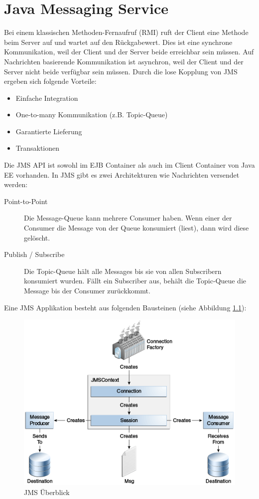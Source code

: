 \chapter{Java Messaging Service}

Bei einem klassischen Methoden-Fernaufruf (RMI) ruft der Client eine Methode beim Server auf und wartet auf den Rückgabewert. Dies ist eine synchrone Kommunikation, weil der Client und der Server beide erreichbar sein müssen. Auf Nachrichten basierende Kommunikation ist asynchron, weil der Client und der Server nicht beide verfügbar sein müssen. Durch die lose Kopplung von JMS ergeben sich folgende Vorteile:

\begin{itemize}
	\item Einfache Integration
	\item One-to-many Kommunikation (z.B. Topic-Queue)
	\item Garantierte Lieferung
	\item Transaktionen
\end{itemize}

Die JMS API ist sowohl im EJB Container als auch im Client Container von Java EE vorhanden. In JMS gibt es zwei Architekturen wie Nachrichten versendet werden:

\begin{description}
	\item[Point-to-Point] Die Message-Queue kann mehrere Consumer haben. Wenn einer der Consumer die Message von der Queue konsumiert (liest), dann wird diese gelöscht.
	\item[Publish / Subscribe] Die Topic-Queue hält alle Messages bis sie von allen Subscribern konsumiert wurden. Fällt ein Subscriber aus, behält die Topic-Queue die Message bis der Consumer zurückkommt.
\end{description}

Eine JMS Applikation besteht aus folgenden Bausteinen (siehe Abbildung \ref{fig:jms-overview}):

\begin{figure}
\centering
\includegraphics[width=0.7\linewidth]{fig/jms-overview}
\caption{JMS Überblick}
\label{fig:jms-overview}
\end{figure}

